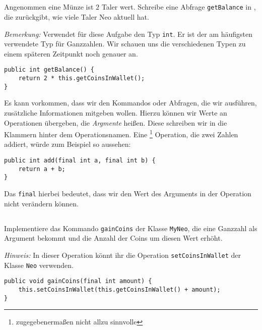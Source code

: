 \begin{questions}
\begin{parts}
    \part{}
    Angenommen eine Münze ist \(2\) Taler wert. Schreibe eine Abfrage \lstinline{getBalance} in \ownclass{}, die zurückgibt, wie viele Taler Neo aktuell hat.

    \emph{Bemerkung:} Verwendet für diese Aufgabe den Typ \lstinline{int}. Er ist der am häufigsten verwendete Typ für Ganzzahlen. Wir schauen uns die verschiedenen Typen zu einem späteren Zeitpunkt noch genauer an.
    \begin{solution}
    \begin{lstlisting}
public int getBalance() {
    return 2 * this.getCoinsInWallet();
}
    \end{lstlisting}
    \end{solution}
    \end{parts}

        Es kann vorkommen, dass wir den Kommandos oder Abfragen, die wir ausführen, zusätzliche Informationen mitgeben wollen. Hierzu können wir Werte an Operationen übergeben, die \emph{Argmente} heißen. Diese schreiben wir in die Klammern hinter dem Operationsnamen. Eine \footnote{zugegebenermaßen nicht allzu sinnvolle} Operation, die zwei Zahlen addiert, würde zum Beispiel so aussehen:
    \begin{lstlisting}
public int add(final int a, final int b) {
    return a + b;
}
    \end{lstlisting}
    Das \lstinline{final} hierbei bedeutet, dass wir den Wert des Arguments in der Operation nicht verändern können.

    \begin{parts}
    \setcounter{partno}{3}
    \part{}
    Implementiere das Kommando \lstinline{gainCoins} der Klasse \lstinline{MyNeo}, die eine Ganzzahl als Argument bekommt und die Anzahl der Coins um diesen Wert erhöht.

    \emph{Hinweis:} In dieser Operation könnt ihr die Operation \lstinline{setCoinsInWallet} der Klasse \lstinline{Neo} verwenden.
    \begin{solution}
    \begin{lstlisting}
public void gainCoins(final int amount) {
    this.setCoinsInWallet(this.getCoinsInWallet() + amount);
}
    \end{lstlisting}
    \end{solution}
    \end{parts}



\end{questions}
